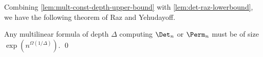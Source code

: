 Combining \autoref{lem:mult-const-depth-upper-bound} with \autoref{lem:det-raz-lowerbound}, we have the following theorem of Raz and Yehudayoff. 

\begin{theorem}
Any multilinear formula of depth $\Delta$ computing $\Det_n$ or $\Perm_n$ must be of size $\exp(n^{\Omega(1/\Delta)})$.  \qed
\end{theorem}



